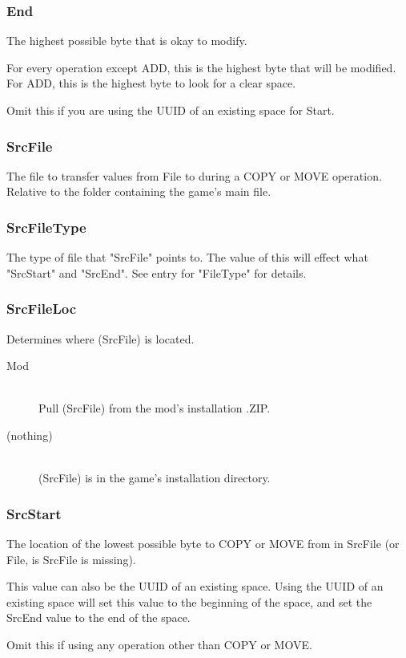 \documentclass[12pt,a4paper,notitlepage]{article}
\begin{document}
\subsubsection{End}
The highest possible byte that is okay to modify.

For every operation except ADD, this is the highest byte that will be modified. For ADD, this is the highest byte to look for a clear space.

Omit this if you are using the UUID of an existing space for Start.

\subsubsection{SrcFile}
The file to transfer values from File to during a COPY or MOVE operation. Relative to the folder containing the game's main file.

\subsubsection{SrcFileType}
The type of file that "SrcFile" points to. The value of this will effect what "SrcStart" and "SrcEnd". See entry for "FileType" for details.

\subsubsection{SrcFileLoc}
Determines where (SrcFile) is located.

\begin{description}
\item[Mod] \hfill \\ 
	Pull (SrcFile) from the mod's installation .ZIP.
\item[(nothing)] \hfill \\
	(SrcFile) is in the game's installation directory.
\end{description}

\subsubsection{SrcStart}
The location of the lowest possible byte to COPY or MOVE from in SrcFile (or File, is SrcFile is missing).

This value can also be the UUID of an existing space. Using the UUID of an existing space will set this value to the beginning of the space, and set the SrcEnd value to the end of the space.

Omit this if using any operation other than COPY or MOVE.
\end{document}

